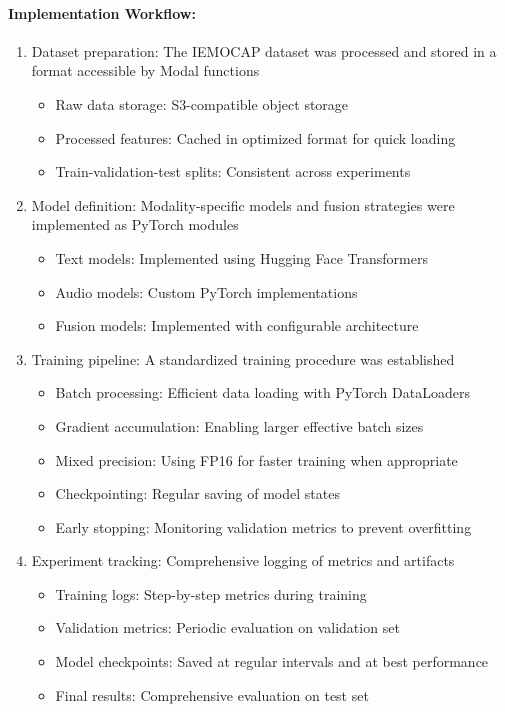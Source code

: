 \documentclass[12pt]{article}
\begin{document}
\paragraph{Implementation Workflow:}
\begin{enumerate}
    \item Dataset preparation: The IEMOCAP dataset was processed and stored in a format accessible by Modal functions
    \begin{itemize}
        \item Raw data storage: S3-compatible object storage
        \item Processed features: Cached in optimized format for quick loading
        \item Train-validation-test splits: Consistent across experiments
    \end{itemize}
    
    \item Model definition: Modality-specific models and fusion strategies were implemented as PyTorch modules
    \begin{itemize}
        \item Text models: Implemented using Hugging Face Transformers
        \item Audio models: Custom PyTorch implementations
        \item Fusion models: Implemented with configurable architecture
    \end{itemize}
    
    \item Training pipeline: A standardized training procedure was established
    \begin{itemize}
        \item Batch processing: Efficient data loading with PyTorch DataLoaders
        \item Gradient accumulation: Enabling larger effective batch sizes
        \item Mixed precision: Using FP16 for faster training when appropriate
        \item Checkpointing: Regular saving of model states
        \item Early stopping: Monitoring validation metrics to prevent overfitting
    \end{itemize}
    
    \item Experiment tracking: Comprehensive logging of metrics and artifacts
    \begin{itemize}
        \item Training logs: Step-by-step metrics during training
        \item Validation metrics: Periodic evaluation on validation set
        \item Model checkpoints: Saved at regular intervals and at best performance
        \item Final results: Comprehensive evaluation on test set
    \end{itemize}
    

\end{enumerate}
\end{document}

